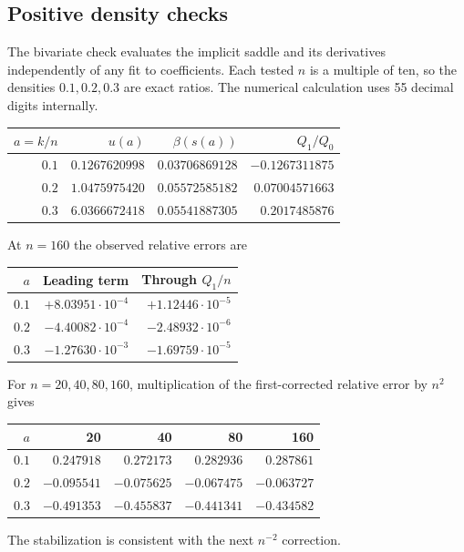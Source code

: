 \documentclass[11pt,letterpaper]{article}
\numberwithin{equation}{section}
\theoremstyle{definition}\newtheorem{definition}[theorem]{Definition}
\theoremstyle{remark}\newtheorem{remark}[theorem]{Remark}
\begin{document}
\subsection{Positive density checks}
The bivariate check evaluates the implicit saddle and its derivatives independently of any fit to coefficients. Each tested $n$ is a multiple of ten, so the densities $0.1,0.2,0.3$ are exact ratios. The numerical calculation uses 55 decimal digits internally.
\begin{center}
\begin{tabular}{@{}rrrr@{}}
\toprule
$a=k/n$ & $u(a)$ & $\beta(s(a))$ & $Q_1/Q_0$\\\midrule
$0.1$ & $0.1267620998$ & $0.03706869128$ & $-0.1267311875$\\
$0.2$ & $1.0475975420$ & $0.05572585182$ & $0.07004571663$\\
$0.3$ & $6.0366672418$ & $0.05541887305$ & $0.2017485876$\\
\bottomrule
\end{tabular}
\end{center}
At $n=160$ the observed relative errors are
\begin{center}
\begin{tabular}{@{}rrr@{}}
\toprule
$a$ & Leading term & Through $Q_1/n$\\\midrule
$0.1$ & $+8.03951\cdot10^{-4}$ & $+1.12446\cdot10^{-5}$\\
$0.2$ & $-4.40082\cdot10^{-4}$ & $-2.48932\cdot10^{-6}$\\
$0.3$ & $-1.27630\cdot10^{-3}$ & $-1.69759\cdot10^{-5}$\\
\bottomrule
\end{tabular}
\end{center}
For $n=20,40,80,160$, multiplication of the first-corrected relative error by $n^2$ gives
\begin{center}
\begin{tabular}{@{}rrrrr@{}}
\toprule
$a$ & 20 & 40 & 80 & 160\\\midrule
$0.1$ & $0.247918$ & $0.272173$ & $0.282936$ & $0.287861$\\
$0.2$ & $-0.095541$ & $-0.075625$ & $-0.067475$ & $-0.063727$\\
$0.3$ & $-0.491353$ & $-0.455837$ & $-0.441341$ & $-0.434582$\\
\bottomrule
\end{tabular}
\end{center}
The stabilization is consistent with the next $n^{-2}$ correction.
\end{document}
